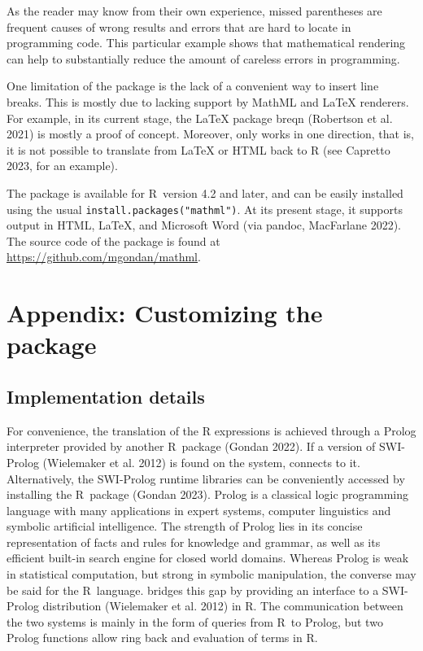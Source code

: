 As the reader may know from their own experience, missed parentheses are frequent
causes of wrong results and errors that are hard to locate in programming code.
This particular example shows that mathematical rendering can help to
substantially reduce the amount of careless errors in programming.

One limitation of the package is the lack of a convenient way to insert line
breaks. This is mostly due to lacking support by MathML and LaTeX renderers.
For example, in its current stage, the LaTeX package breqn (Robertson et al. 2021) is mostly
a proof of concept. Moreover,  only works in one direction,
that is, it is not possible to translate from LaTeX or HTML back to R
(see Capretto 2023, for an example).

The package  is available for R~version 4.2 and later, and can be
easily installed using the usual \texttt{install.packages("mathml")}. At its present
stage, it supports output in HTML, LaTeX, and Microsoft
Word (via pandoc, MacFarlane 2022). The source code of the package is found
at \url{https://github.com/mgondan/mathml}.

\hypertarget{appendix-customizing-the-package}{%
\section{Appendix: Customizing the package}\label{appendix-customizing-the-package}}

\hypertarget{implementation-details}{%
\subsection{Implementation details}\label{implementation-details}}

For convenience, the translation of the R expressions is achieved through a
Prolog interpreter provided by another R~package  (Gondan 2022). If a
version of SWI-Prolog (Wielemaker et al. 2012) is found on the system,  connects
to it. Alternatively, the SWI-Prolog runtime libraries can be conveniently
accessed by installing the R~package  (Gondan 2023). Prolog is a
classical logic programming language with many applications in expert systems,
computer linguistics and symbolic artificial intelligence. The strength of
Prolog lies in its concise representation of facts and rules for knowledge and
grammar, as well as its efficient built-in search engine for closed world
domains. Whereas Prolog is weak in statistical computation, but strong in
symbolic manipulation, the converse may be said for the R~language. 
bridges this gap by providing an interface to a SWI-Prolog
distribution (Wielemaker et al. 2012) in R. The communication between the two systems is mainly
in the form of queries from R~to Prolog, but two Prolog functions allow ring
back and evaluation of terms in R.

